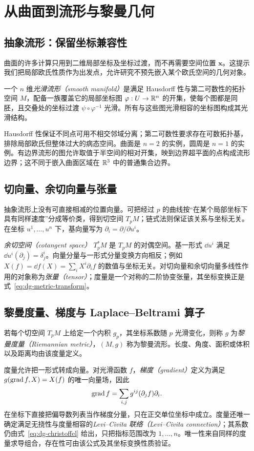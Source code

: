 \setcounter{chapter}{10} %
\chapter{从曲面到流形与黎曼几何}
\label{chap:dg-manifolds}

\section{抽象流形：保留坐标兼容性}
曲面的许多计算只用到二维局部坐标及坐标过渡，而不再需要空间位置 $\mathbf x$。这提示我们把局部欧氏性质作为出发点，允许研究不预先嵌入某个欧氏空间的几何对象。

\begin{definition}[光滑流形]
一个 $n$ 维\emph{光滑流形（smooth manifold）}是满足 Hausdorff 性与第二可数性的拓扑空间 $M$，配备一族覆盖它的局部坐标图 $\varphi:U\to\mathbb R^n$ 的开集，使每个图都是同胚，且交叠处的坐标过渡 $\psi\circ\varphi^{-1}$ 光滑。所有与这些图光滑相容的坐标图构成其光滑结构。
\end{definition}
Hausdorff 性保证不同点可用不相交邻域分离；第二可数性要求存在可数拓扑基，排除局部欧氏但整体过大的病态空间。曲面是 $n=2$ 的实例，圆周是 $n=1$ 的实例。有边界流形的图允许取值于半空间的相对开集，映到边界超平面的点构成流形边界；这不同于嵌入曲面区域在 $\mathbb R^3$ 中的普通集合边界。

\section{切向量、余切向量与张量}
抽象流形上没有可直接相减的位置向量。可把经过 $p$ 的曲线按“在某个局部坐标下具有同样速度”分成等价类，得到切空间 $T_pM$；链式法则保证该关系与坐标无关。在坐标 $u^1,\ldots,u^n$ 下，基向量写为 $\partial_i=\partial/\partial u^i$。

\emph{余切空间（cotangent space）} $T_p^*M$ 是 $T_pM$ 的对偶空间。基一形式 $\dd u^i$ 满足 $\dd u^i(\partial_j)=\delta^i_j$。向量分量与一形式分量变换方向相反；例如 $X(f)=\dd f(X)=\sum_iX^i\partial_i f$ 的数值与坐标无关。对切向量和余切向量多线性作用的对象称为\emph{张量（tensor）}；度量是一个对称的二阶协变张量，其坐标变换正是式~\eqref{eq:dg-metric-transform}。

\section{黎曼度量、梯度与 Laplace--Beltrami 算子}
\begin{definition}[黎曼度量]
若每个切空间 $T_pM$ 上给定一个内积 $g_p$，其坐标系数随 $p$ 光滑变化，则称 $g$ 为\emph{黎曼度量（Riemannian metric）}，$(M,g)$ 称为黎曼流形。长度、角度、面积或体积以及距离均由该度量定义。
\end{definition}
度量允许把一形式转成向量。对光滑函数 $f$，\emph{梯度（gradient）}定义为满足 $g(\operatorname{grad} f,X)=X(f)$ 的唯一向量场，因此
\[
 \operatorname{grad} f=\sum_{i,j}g^{ij}(\partial_jf)\partial_i.
\]
在坐标下直接把偏导数列表当作梯度分量，只在正交单位坐标中成立。度量还唯一确定满足无挠性与度量相容的\emph{Levi--Civita 联络（Levi--Civita connection）}；其系数仍由式~\eqref{eq:dg-christoffel} 给出，只把指标范围改为 $1,\ldots,n$。唯一性来自同样的度量求导组合，存在性可由该公式及其坐标变换性质验证。

